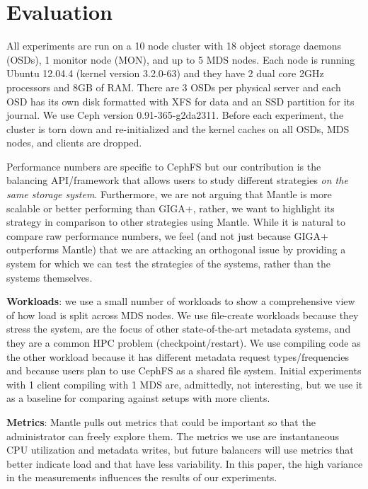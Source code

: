 \section{Evaluation}									%
\label{evaluation}										%
All experiments are run on a 10 node cluster with 18 object storage daemons (OSDs), 1 monitor node (MON), and up to 5 MDS nodes. Each node is running Ubuntu 12.04.4 (kernel version 3.2.0-63) and they have 2 dual core 2GHz processors and 8GB of RAM. There are 3 OSDs per physical server and each OSD has its own disk formatted with XFS for data and an SSD partition for its journal. We use Ceph version 0.91-365-g2da2311. Before each experiment, the cluster is torn down and re-initialized and the kernel caches on all OSDs, MDS nodes, and clients are dropped. 

Performance numbers are specific to CephFS but our contribution is the balancing API/framework that allows users to study different strategies {\it on the same storage system}.  Furthermore, we are not arguing that Mantle is more scalable or better performing than GIGA+, rather, we want to highlight its strategy in comparison to other strategies using Mantle. While it is natural to compare raw performance numbers, we feel (and not just because GIGA+ outperforms Mantle) that we are attacking an orthogonal issue by providing a system for which we can test the strategies of the systems, rather than the systems themselves. 

\textbf{Workloads}: we use a small number of workloads to show a comprehensive view of how load is split across MDS nodes. We use file-create workloads because they stress the system, are the focus of other state-of-the-art metadata systems, and they are a common HPC problem (checkpoint/restart). We use compiling code as the other workload because it has different metadata request types/frequencies and because users plan to use CephFS as a shared file system. Initial experiments with 1 client compiling with 1 MDS are, admittedly, not interesting, but we use it as a baseline for comparing against setups with more clients. 

\textbf{Metrics}: Mantle pulls out metrics that could be important so that the administrator can freely explore them. The metrics we use are instantaneous CPU utilization and metadata writes, but future balancers will use metrics that better indicate load and that have less variability. In this paper, the high variance in the measurements influences the results of our experiments.

